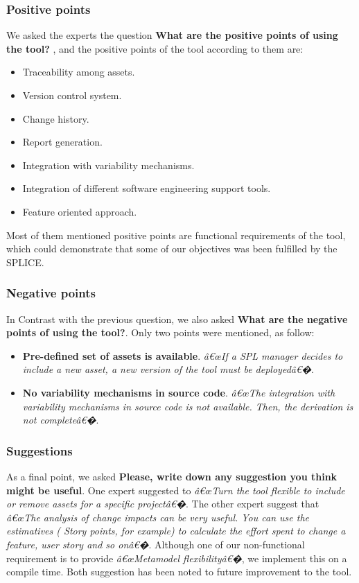 \subsubsection{Positive points}
We asked the experts the question \textbf{What are the positive points of using the tool? } , and the positive points of the tool according to them are:
\begin{itemize}
\item Traceability among assets.
\item Version control system.
\item Change history.
\item Report generation.
\item Integration with variability mechanisms.
\item Integration of different software engineering support tools.
\item Feature oriented approach.
\end{itemize}
Most of them mentioned positive points are functional requirements of the tool, which could demonstrate that some of our objectives was been fulfilled by the \ac{SPLICE}.

\subsubsection{Negative points}
In Contrast with the previous question, we also asked \textbf{ What are the negative points of using the tool?}. Only two points were mentioned, as follow:
\begin{itemize}

\item \textbf{Pre-defined set of assets is available}. \textit{â€œIf a SPL manager decides to include a new asset, a new version of the tool must be deployedâ€�}.

\item \textbf{No variability mechanisms in source code}. \textit{â€œThe integration with variability mechanisms in source code is not available. Then, the derivation is not completeâ€�}.
\end{itemize}


\subsubsection{Suggestions}
As a final point, we asked \textbf{Please, write down any suggestion you think might be useful}.
One expert suggested to \textit{â€œTurn the tool flexible to include or remove assets for a specific projectâ€�}. The other expert suggest that \textit{â€œThe analysis of change impacts can be very useful. You can use the estimatives ( Story points, for example) to calculate the effort spent to change a feature, user story and so onâ€�}. 
Although one of our non-functional requirement is to provide \textit{â€œMetamodel flexibilityâ€�}, we implement this on a compile time. Both suggestion has been noted to future improvement to the tool.

